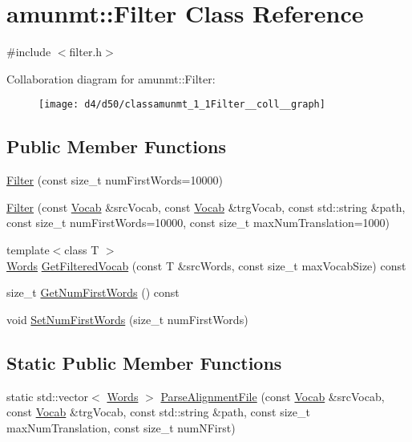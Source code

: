 \hypertarget{classamunmt_1_1Filter}{}\section{amunmt\+:\+:Filter Class Reference}
\label{classamunmt_1_1Filter}


{\ttfamily \#include $<$filter.\+h$>$}



Collaboration diagram for amunmt\+:\+:Filter\+:
\nopagebreak
\begin{figure}[H]
\begin{center}
\leavevmode
\texttt{[image: d4/d50/classamunmt\_1\_1Filter\_\_coll\_\_graph]}
\end{center}
\end{figure}
\subsection*{Public Member Functions}
\begin{DoxyCompactItemize}
\item 
\hyperlink{classamunmt_1_1Filter_a2f1930edcf77b0e457dee551bec9bfde}{Filter} (const size\+\_\+t num\+First\+Words=10000)
\item 
\hyperlink{classamunmt_1_1Filter_a876cd1873c845ac085771497bbe7f628}{Filter} (const \hyperlink{classamunmt_1_1Vocab}{Vocab} \&src\+Vocab, const \hyperlink{classamunmt_1_1Vocab}{Vocab} \&trg\+Vocab, const std\+::string \&path, const size\+\_\+t num\+First\+Words=10000, const size\+\_\+t max\+Num\+Translation=1000)
\item 
{\footnotesize template$<$class T $>$ }\\\hyperlink{namespaceamunmt_aa50d0b3a5ba58ba5da8a4d88ddab1b18}{Words} \hyperlink{classamunmt_1_1Filter_a2590b529fb636d351730f2fae05a78e9}{Get\+Filtered\+Vocab} (const T \&src\+Words, const size\+\_\+t max\+Vocab\+Size) const 
\item 
size\+\_\+t \hyperlink{classamunmt_1_1Filter_a8b4e8daccd3d04c498574647b3493ace}{Get\+Num\+First\+Words} () const 
\item 
void \hyperlink{classamunmt_1_1Filter_afa06c9b88b2a63f4868ce2e5317011d3}{Set\+Num\+First\+Words} (size\+\_\+t num\+First\+Words)
\end{DoxyCompactItemize}
\subsection*{Static Public Member Functions}
\begin{DoxyCompactItemize}
\item 
static std\+::vector$<$ \hyperlink{namespaceamunmt_aa50d0b3a5ba58ba5da8a4d88ddab1b18}{Words} $>$ \hyperlink{classamunmt_1_1Filter_a8577454f5c8aa797f92c53c51d7791bc}{Parse\+Alignment\+File} (const \hyperlink{classamunmt_1_1Vocab}{Vocab} \&src\+Vocab, const \hyperlink{classamunmt_1_1Vocab}{Vocab} \&trg\+Vocab, const std\+::string \&path, const size\+\_\+t max\+Num\+Translation, const size\+\_\+t num\+N\+First)
\end{DoxyCompactItemize}
